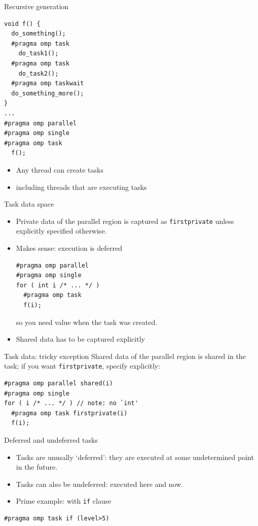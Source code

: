 \begin{numberedframe}{Recursive generation}
\begin{lstlisting}
void f() {
  do_something();
  #pragma omp task
    do_task1();
  #pragma omp task
    do_task2();
  #pragma omp taskwait
  do_something_more();
}
...
#pragma omp parallel
#pragma omp single
#pragma omp task
  f();
\end{lstlisting}
  \begin{itemize}
  \item Any thread can create tasks
  \item including threads that are executing tasks
  \end{itemize}
\end{numberedframe}

\begin{exerciseframe}[taskfactor]
  
\end{exerciseframe}

\begin{numberedframe}{Task data space}
  \begin{itemize}
  \item Private data of the parallel region is
    captured as \lstinline{firstprivate}
    unless explicitly specified otherwise.
  \item Makes sense: execution is deferred
\begin{lstlisting}
#pragma omp parallel
#pragma omp single
for ( int i /* ... */ )
  #pragma omp task
  f(i);
\end{lstlisting}
so you need value when the task was created.
  \item Shared data has to be captured explicitly
  \end{itemize}
\end{numberedframe}

\begin{numberedframe}{Task data: tricky exception}
  Shared data of the parallel region is shared in the task;
  if you want \lstinline{firstprivate}, specify explicitly:
\begin{lstlisting}
#pragma omp parallel shared(i)
#pragma omp single
for ( i /* ... */ ) // note: no `int'
  #pragma omp task firstprivate(i)
  f(i);
\end{lstlisting}
\end{numberedframe}

\begin{numberedframe}{Deferred and undeferred tasks}
  \begin{itemize}
  \item Tasks are unusally `deferred': they are executed
    at some undetermined point in the future.
  \item Tasks can also be undeferred: executed here and now.
  \item Prime example: with \lstinline{if} clause
  \end{itemize}
\begin{lstlisting}[numbers=none]
#pragma omp task if (level>5)
\end{lstlisting}
\end{numberedframe}

